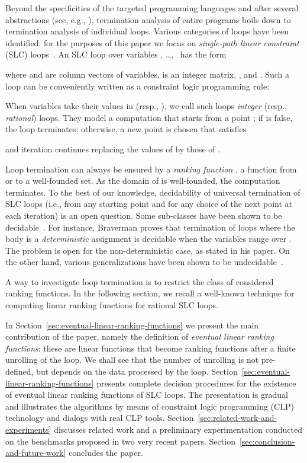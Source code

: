 \documentclass{acm_proc_article-sp}
\begin{document}
Beyond the specificities of the targeted programming languages and after
several abstractions (see, e.g., \cite{SpotoMP10}), termination analysis
of entire programs boils down to termination analysis of individual loops.
Various categories of loops have been identified: for the purposes of
this paper we focus on \emph{single-path linear constraint} (SLC)
loops~\cite{Ben-AmramG13TR}.
An SLC loop over  variables , \dots,~ has the form

where 
and 
are column vectors of variables,
 is an integer matrix, ,
 and .
Such a loop can be conveniently written as a constraint logic
programming rule:

When variables take their values in  (resp., ),
we call such loops \emph{integer} (resp., \emph{rational}) loops.
They model a computation that starts from a point ;
if  is false, the loop terminates;
otherwise, a new point  is chosen that satisfies

and iteration continues replacing the values of 
by those of .

Loop termination can always be ensured by a \emph{ranking function}
, a function from  or  to a well-founded set.
As the domain of  is well-founded, the computation terminates.
To the best of our knowledge, decidability of universal termination
of SLC loops (i.e., from any starting point and for any choice of
the next point at each iteration) is an open question.
Some sub-classes have been shown to be
decidable~\cite{BozgaIK12,Braverman06,Tiwari04}.
For instance, Braverman proves that termination of
loops where the body is a \emph{deterministic} assignment
 is decidable when the variables range over .
The problem is open for the non-deterministic case, as stated in his paper.
On the other hand, various generalizations have been shown
to be undecidable~\cite{Ben-AmramGM12}.

A way to investigate loop termination is to restrict the class of
considered ranking functions.
In the following section, we recall a well-known technique
for computing linear ranking functions for rational SLC loops.

In Section~\ref{sec:eventual-linear-ranking-functions}
we present the main contribution of the paper,
namely the definition of \emph{eventual linear ranking functions}:
these are linear functions that become
ranking functions after a finite unrolling of the loop.
We shall see that the number of unrolling is not pre-defined, but
depends on the data processed by the loop.
Section~\ref{sec:eventual-linear-ranking-functions} presents
complete decision procedures for the existence of
eventual linear ranking functions of SLC loops.  The presentation is
gradual and illustrates the algorithms by means
of constraint logic programming (CLP) technology and dialogs with real
CLP tools.
Section~\ref{sec:related-work-and-experiments} discusses related
work and a preliminary experimentation conducted on the benchmarks
proposed in two very recent papers.
Section~\ref{sec:conclusion-and-future-work} concludes the paper.
\end{document}
